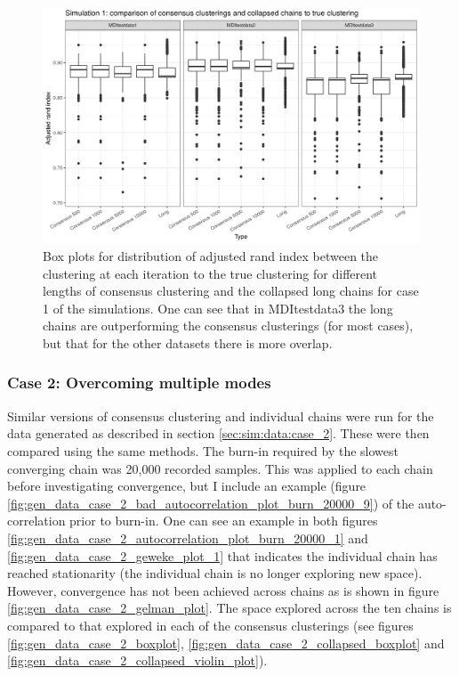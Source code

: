 \documentclass[12pt]{article} %
\begin{document}
		\begin{figure}[!htb]
			\centering
			\includegraphics[scale=0.65]{Images/Gen_data/Case_1/box_plot_ari_true_clustering_collapsed_long_burn_in.png}
			\caption{Box plots for distribution of adjusted rand index between the clustering at each iteration to the true clustering for different lengths of consensus clustering and the collapsed long chains for case 1 of the simulations. One can see that in MDItestdata3 the long chains are outperforming the consensus clusterings (for most cases), but that for the other datasets there is more overlap.}
			\label{fig:gen_data_case_1_collapsed_boxplot}
		\end{figure}
		

	
	\subsubsection{Case 2: Overcoming multiple modes} \label{sec:results:case_2}
	Similar versions of consensus clustering and individual chains were run for the data generated as described in section \ref{sec:sim:data:case_2}. These were then compared using the same methods. The burn-in required by the slowest converging chain was 20,000 recorded samples. This was applied to each chain before investigating convergence, but I include an example (figure \ref{fig:gen_data_case_2_bad_autocorrelation_plot_burn_20000_9}) of the auto-correlation prior to burn-in. One can see an example in both figures \ref{fig:gen_data_case_2_autocorrelation_plot_burn_20000_1} and \ref{fig:gen_data_case_2_geweke_plot_1} that indicates the individual chain has reached stationarity (the individual chain is no longer exploring new space). However, convergence has not been achieved across chains as is shown in figure \ref{fig:gen_data_case_2_gelman_plot}. The space explored across the ten chains is compared to that explored in each of the consensus clusterings (see figures \ref{fig:gen_data_case_2_boxplot}, \ref{fig:gen_data_case_2_collapsed_boxplot} and \ref{fig:gen_data_case_2_collapsed_violin_plot}).
	
\end{document}
